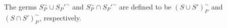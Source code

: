 The germs $S_P^\sim \cup S_P'^\sim$ and $S_P^\sim \cap S_P'^\sim$ are defined to be $(S \cup S')_P^\sim$ and $(S \cap S')_P^\sim$, respectively.
